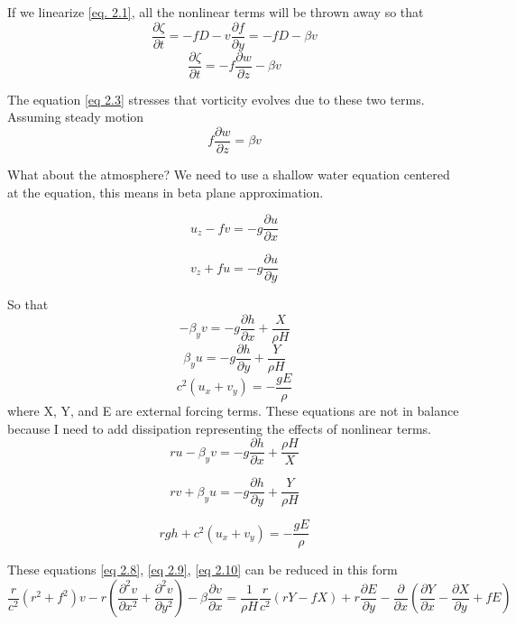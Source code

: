 If we linearize \ref{eq. 2.1}, all the nonlinear terms will be thrown away so that
\begin{equation}\label{eq 2.3}
	\frac{\partial \zeta}{\partial t} = - f D - v \frac{\partial f}{\partial y} = - f D - \beta v
\end{equation}
\begin{equation}
	\frac{\partial \zeta}{\partial t} = - f \frac{\partial w}{\partial z} - \beta v
\end{equation}

The equation \ref{eq 2.3} stresses that vorticity evolves due to these two terms.
Assuming steady motion
\begin{equation}
	f \frac{\partial w}{\partial z} = \beta v
\end{equation}

What about the atmosphere?
We need to use a shallow water equation centered at the equation, this means in beta plane approximation.

\begin{equation}
	u_z- fv = -g \frac{\partial u}{\partial x}
\end{equation}

\begin{equation}
	v_z + fu = -g \frac{\partial u}{\partial y}
\end{equation}

So that
$$-\beta_y v = -g \frac{\partial h}{\partial x} + \frac{X}{\rho H}$$
$$\beta_y u = -g \frac{\partial h}{\partial y} + \frac{Y}{\rho H}$$
$$c^2 (u_x + v_y) = -\frac{gE}{\rho}$$
where X, Y, and E are external forcing terms.
These equations are not in balance because I need to add dissipation representing the effects of nonlinear terms.
\begin{equation}\label{eq 2.8}
	r u - \beta_y v = -g \frac{\partial h}{\partial x} + \frac{\rho H}{X}
\end{equation}


\begin{equation}\label{eq 2.9}
	r v +\beta_y u = -g \frac{\partial h}{\partial y} + \frac{Y}{\rho H}
\end{equation}

\begin{equation}\label{eq 2.10}
	r g h + c^2 (u_x + v_y) = -\frac{gE}{\rho}
\end{equation}



These equations \ref{eq 2.8}, \ref{eq 2.9}, \ref{eq 2.10} can be reduced in this form
\begin{equation}\label{2.11}
	\frac{r}{c^2} \left( r^2 + f^2 \right) v - r \left( \frac{\partial^2 v}{\partial x^2} + \frac{\partial^2 v}{\partial y^2} \right) - \beta \frac{\partial v}{\partial x}
	= \frac{1}{\rho H} \frac{r}{c^2} \left( rY - fX \right) + r \frac{\partial E}{\partial y} - \frac{\partial}{\partial x} \left( \frac{\partial Y}{\partial x} - \frac{\partial X}{\partial y} + fE \right)
\end{equation}


